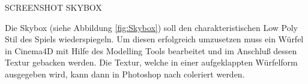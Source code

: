 

SCREENSHOT SKYBOX

Die Skybox (siehe Abbildung \ref{fig:Skybox}) soll den charakteristischen Low Poly Stil des Spiels wiederspiegeln. Um diesen erfolgreich umzusetzen muss ein Würfel in Cinema4D mit Hilfe des Modelling Tools bearbeitet und im Anschluß dessen Textur gebacken werden. Die Textur, welche in einer aufgeklappten Würfelform ausgegeben wird, kann dann in Photoshop nach coleriert werden.